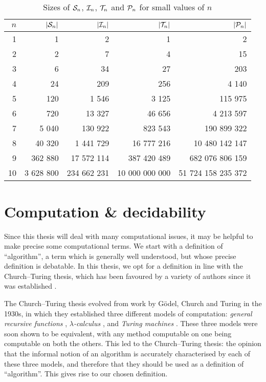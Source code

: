 \begin{table}[ht]
  \centering
  \renewcommand\arraystretch{1.0}
  \begin{tabular}{| r | r | r | r | r |}
    \hline
    $n$ & $|\mathcal{S}_n|$ & $|\mathcal{I}_n|$ & $|\mathcal{T}_n|$ & $|\mathcal{P}_n|$ \\
    \hline
     1 &         1&           2&              1&                  2 \\
     2 &         2&           7&              4&                 15 \\
     3 &         6&          34&             27&                203 \\
     4 &        24&         209&            256&              4 140 \\
     5 &       120&       1 546&          3 125&            115 975 \\
     6 &       720&      13 327&         46 656&          4 213 597 \\
     7 &     5 040&     130 922&        823 543&        190 899 322 \\
     8 &    40 320&   1 441 729&     16 777 216&     10 480 142 147 \\
     9 &   362 880&  17 572 114&    387 420 489&    682 076 806 159 \\
    10 & 3 628 800& 234 662 231& 10 000 000 000& 51 724 158 235 372 \\
    \hline
  \end{tabular}
  \renewcommand\arraystretch{0.7}
  \caption{Sizes of $\mathcal{S}_n$, $\mathcal{I}_n$, $\mathcal{T}_n$ and $\mathcal{P}_n$ for small values of
    $n$}
  \label{tab:pn-size}
\end{table}

\section{Computation \& decidability}
\label{sec:computation-decidability}

Since this thesis will deal with many computational issues, it may be helpful to
make precise some computational terms.  We start with a definition of
``algorithm'', a term which is generally well understood, but whose precise
definition is debatable.  In this thesis, we opt for a definition in line with
the Church--Turing thesis, which has been favoured by a variety of authors since
it was established \cite{minsky_1967, gurevich_2000}.

The Church--Turing thesis evolved from work by G\"{o}del, Church and Turing in
the 1930s, in which they established three different models of computation:
\textit{general recursive functions} \cite{godel}, \textit{$\lambda$-calculus}
\cite{church}, and \textit{Turing machines} \cite{turing}.  These three models
were soon shown to be equivalent, with any method computable on one being
computable on both the others.  This led to the Church--Turing thesis: the
opinion that the informal notion of an algorithm is accurately characterised by
each of these three models, and therefore that they should be used as a
definition of ``algorithm''.  This gives rise to our chosen definition.

